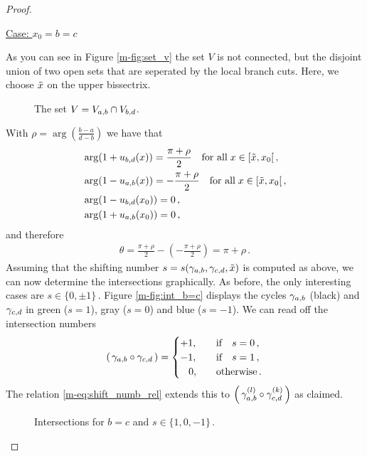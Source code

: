 \documentclass[main.tex]{subfiles}
\begin{document}
\begin{proof}
\begin{itemize}
  \begin{center}
   \underline{Case: $x_0 = b = c$}
  \end{center}
  As you can see in Figure \ref{m-fig:set_v} the set $V$ is not connected, but the disjoint union of two open sets that are seperated by the local branch cuts. Here, we choose $\tilde{x}$ on the upper bissectrix.
   \begin{figure}[H]
      \begin{center}
	  
      \end{center}
    \caption{The set $V = V_{a,b} \cap V_{b,d}$.}
    \label{fig:set_v}
\end{figure}
  With $\rho = \arg\left(\frac{b-a}{d-b}\right)$ we have that
  \begin{align*}
   & \arg (1+u_{b,d}(x)) = \frac{\pi+\rho}{2} \quad \text{for all} \; x \in [\tilde{x},x_0[\,,\\
   & \arg (1-u_{a,b}(x)) = -\frac{\pi+\rho}{2} \quad \text{for all} \; x \in [\tilde{x},x_0[\,,\\
   & \arg (1-u_{b,d}(x_0)) = 0\,,\\ 
   & \arg (1+u_{a,b}(x_0))= 0\,,
  \end{align*}
  and therefore 
  \begin{align*}
   \theta = \frac{\pi+\rho}{2} - (-\frac{\pi+\rho}{2}) = \pi + \rho\,.
  \end{align*}
  Assuming that the shifting number $s=s(\gamma_{a,b},\gamma_{c,d},\tilde{x})$ is computed as above, we can now determine the intersections graphically. \abstandl
  As before, the only interesting cases
  are $s \in \{0,\pm 1\}$\,. Figure \ref{m-fig:int_b=c} displays the cycles $\gamma_{a,b}$ (black) and $\gamma_{c,d}$ in green ($s=1$), gray ($s=0$) and blue ($s=-1$). 
  We can read off the intersection numbers
  \begin{align*}
    \left(\,\gamma_{a,b} \circ \gamma_{c,d}\,\right) = \begin{cases}
                                          +1, \quad & \text{if} \quad s=0\,,\\
                                          -1, \quad & \text{if} \quad s=1\,,\\
                                          \quad\!0, \quad & \text{otherwise}\,.
                                         \end{cases}
  \end{align*}
  The relation \eqref{m-eq:shift_numb_rel} extends this to $\left(\,\gamma_{a,b}^{(l)} \circ \gamma_{c,d}^{(k)}\,\right)$ as claimed. 
  \begin{figure}[H]
      \begin{center}
	  
      \end{center}
    \caption{Intersections for $b=c$ and $s \in \{1,0,-1\}$\,.}
    \label{fig:int_b=c}
\end{figure}
	\end{itemize}
  \end{proof}
	
\end{document}
